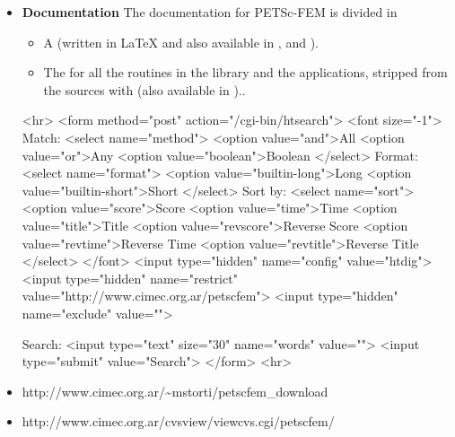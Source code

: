 \documentclass[11pt]{article}
\begin{document}
\begin{itemize}
\item \textbf{Documentation}
The documentation for PETSc-FEM is divided in 

\begin{itemize}
\item A 
(written in \LaTeX{} and also available in
, and ).

\item The  for all the routines in the
library and the applications, stripped from the sources with
(also available in )..
\end{itemize}

\begin{rawhtml}
<hr>
<form method="post" action="/cgi-bin/htsearch">
<font size="-1">
Match: <select name="method">
<option value="and">All
<option value="or">Any
<option value="boolean">Boolean
</select>
Format: <select name="format">
<option value="builtin-long">Long
<option value="builtin-short">Short
</select>
Sort by: <select name="sort">
<option value="score">Score
<option value="time">Time
<option value="title">Title
<option value="revscore">Reverse Score
<option value="revtime">Reverse Time
<option value="revtitle">Reverse Title
</select>
</font>
<input type="hidden" name="config" value="htdig">
<input type="hidden" name="restrict" value="http://www.cimec.org.ar/petscfem">
<input type="hidden" name="exclude" value="">

Search:
<input type="text" size="30" name="words" value="">
<input type="submit" value="Search">
</form>
<hr>
\end{rawhtml}

\item {}
                {http://www.cimec.org.ar/\~{}mstorti/petscfem_download}
\item {}
                {http://www.cimec.org.ar/cvsview/viewcvs.cgi/petscfem/} 

\end{itemize}
\end{document}
